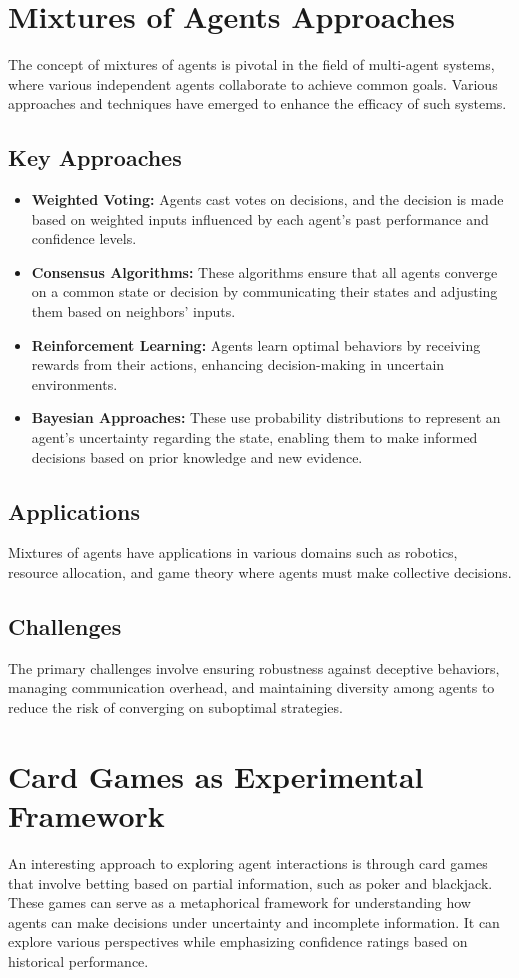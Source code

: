 \section{Mixtures of Agents Approaches}
The concept of mixtures of agents is pivotal in the field of multi-agent systems, where various independent agents collaborate to achieve common goals. Various approaches and techniques have emerged to enhance the efficacy of such systems.

\subsection{Key Approaches}
\begin{itemize}
    \item \textbf{Weighted Voting:} Agents cast votes on decisions, and the decision is made based on weighted inputs influenced by each agent's past performance and confidence levels.
    \item \textbf{Consensus Algorithms:} These algorithms ensure that all agents converge on a common state or decision by communicating their states and adjusting them based on neighbors’ inputs.
    \item \textbf{Reinforcement Learning:} Agents learn optimal behaviors by receiving rewards from their actions, enhancing decision-making in uncertain environments.
    \item \textbf{Bayesian Approaches:} These use probability distributions to represent an agent's uncertainty regarding the state, enabling them to make informed decisions based on prior knowledge and new evidence.
\end{itemize}

\subsection{Applications}
Mixtures of agents have applications in various domains such as robotics, resource allocation, and game theory where agents must make collective decisions.

\subsection{Challenges}
The primary challenges involve ensuring robustness against deceptive behaviors, managing communication overhead, and maintaining diversity among agents to reduce the risk of converging on suboptimal strategies.

\section{Card Games as Experimental Framework}
An interesting approach to exploring agent interactions is through card games that involve betting based on partial information, such as poker and blackjack. These games can serve as a metaphorical framework for understanding how agents can make decisions under uncertainty and incomplete information. It can explore various perspectives while emphasizing confidence ratings based on historical performance. 

